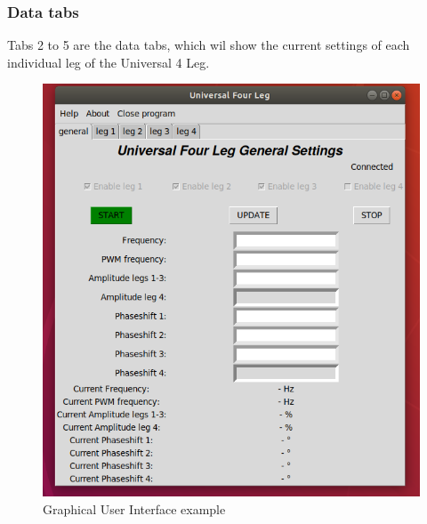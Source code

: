 \documentclass{article}
\begin{document}
\subsubsection{Data tabs}
Tabs 2 to 5 are the data tabs, which wil show the current settings of each individual leg of the Universal 4 Leg.
\begin{figure}[h!]
\centering
\includegraphics[width=\linewidth]{pictures/GUI.png}
\caption{Graphical User Interface example}
\label{GUI}
\end{figure}

\clearpage
\newpage
\end{document}
